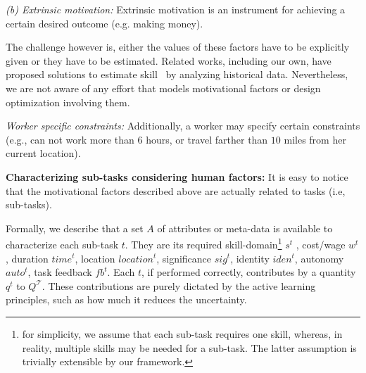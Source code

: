 

{\em (b) Extrinsic motivation:} Extrinsic motivation is  an instrument for achieving a certain desired outcome (e.g. making money).


The challenge however is, either the values of these factors have to be explicitly given or they have to be estimated. Related works, including our own, have proposed solutions to estimate skill~\cite{skill,DBLP:conf/kdd/JoglekarGP13} by analyzing historical data. %
Nevertheless, we are not aware of any effort that models motivational factors or design optimization involving them.

{\em Worker specific constraints:} Additionally, a worker may specify certain constraints (e.g., can not work more than $6$ hours, or travel farther than $10$ miles from her current location).

{\bf Characterizing sub-tasks considering human factors:}  It is easy to notice that the motivational factors described above are actually related to tasks (i.e, sub-tasks). 

Formally, we describe that a set $A$ of attributes or meta-data is available to characterize each sub-task $t$. They are its required skill-domain\footnote{\small for simplicity, we assume that each sub-task requires one skill, whereas, in reality, multiple skills may be needed for a sub-task. The latter assumption is trivially extensible by our framework.} $s^t$ , cost/wage $w^t$, duration $time^t$, location $location^t$, significance $sig^t$, identity $iden^t$, autonomy $auto^t$, task feedback $fb^t$. Each $t$, if performed correctly, contributes by a quantity  $q^t$ to $Q^\mathcal{T}$. These contributions are purely dictated by the active learning principles, such as how much it reduces the uncertainty.





 






